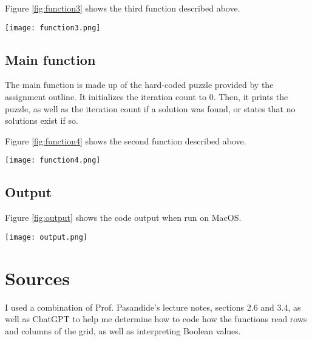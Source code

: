 \documentclass{report}
\begin{document}
\centerline{Figure \ref{fig:function3} shows the third function described above.}
  \begin{center}
  \texttt{[image: function3.png]}
  \label{fig:function3}
  \end{center}

\subsection{Main function}
The main function is made up of the hard-coded puzzle provided by the assignment outline. It initializes the iteration count to 0. Then, it prints the puzzle, as well as the iteration count if a solution was found, or states that no solutions exist if so. 

\centerline{Figure \ref{fig:function4} shows the second function described above.}
  \begin{center}
  \texttt{[image: function4.png]}
  \label{fig:function4}
  \end{center}

\subsection{Output}
\centerline{Figure \ref{fig:output} shows the code output when run on MacOS.}
  \begin{center}
  \texttt{[image: output.png]}
  \label{fig:output}
  \end{center}

\section{Sources}
I used a combination of Prof. Pasandide's lecture notes, sections 2.6 and 3.4, as well as ChatGPT to help me determine how to code how the functions read rows and columns of the grid, as well as interpreting Boolean values. 
\end{document}
